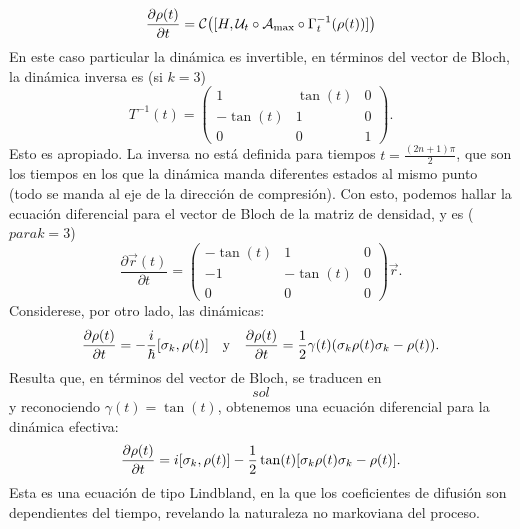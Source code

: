 \begin{equation*}
    \frac{\partial \rho(t)}{\partial t}=\mathcal{C}\qty([H,\mathcal{U}_{t}\circ\mathcal{A}_{\max}\circ\Gamma_{t}^{-1}(\rho(t))])
\end{equation*}
En este caso particular la dinámica es invertible, en términos del vector de Bloch, la dinámica inversa es (si $k=3$)
\begin{equation*}
    T^{-1}(t)=\begin{pmatrix}
        1 & \tan(t) & 0 \\
        -\tan(t) & 1 & 0 \\
        0 & 0 & 1
     \end{pmatrix}.
\end{equation*}
Esto es apropiado. La inversa no está definida para tiempos $t=\frac{(2n+1)\pi}{2}$, que son los tiempos en los que la dinámica manda diferentes estados al mismo punto (todo se manda al eje de la dirección de compresión). Con esto, podemos hallar la ecuación diferencial para el vector de Bloch de la matriz de densidad, y es ($para k=3$)
\begin{equation*}
    \frac{\partial \vec{r}(t)}{\partial t}= \begin{pmatrix}
        -\tan(t) & 1 & 0 \\
        -1 & -\tan(t) & 0 \\
        0 & 0 & 0
     \end{pmatrix}\vec{r}.
\end{equation*}
Considerese, por otro lado, las dinámicas:
\begin{align*}
    \frac{\partial \rho(t)}{\partial t}=-\frac{i}{\hbar}[\sigma_{k},\rho(t)]& & \text{y} & & \frac{\partial \rho(t)}{\partial t}=\frac{1}{2}\gamma(t)\qty(\sigma_{k}\rho(t)\sigma_{k}-\rho(t)).
\end{align*}
Resulta que, en términos del vector de Bloch, se traducen en 
\begin{equation*}
    sol
\end{equation*}
y reconociendo $\gamma(t)=\tan(t)$, obtenemos una ecuación diferencial para la dinámica efectiva:
\begin{equation*}
    \frac{\partial \rho(t)}{\partial t}=i[\sigma_{k},\rho(t)]-\frac{1}{2}\tan(t)\qty[\sigma_{k}\rho(t)\sigma_{k}-\rho(t)].
\end{equation*}
Esta es una ecuación de tipo Lindbland, en la que los coeficientes de difusión son dependientes del tiempo, revelando la naturaleza no markoviana del proceso.